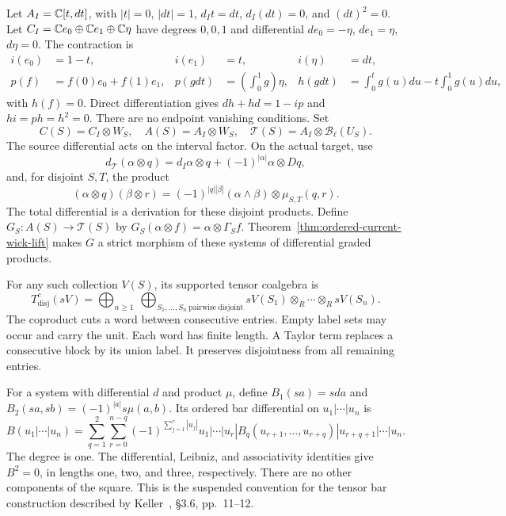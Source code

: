 Let $A_I=\mathbb C[t,dt]$, with $|t|=0$, $|dt|=1$, $d_It=dt$,
$d_I(dt)=0$, and $(dt)^2=0$.  Let
$C_I=\mathbb C e_0\oplus\mathbb C e_1\oplus\mathbb C\eta$ have degrees $0,0,1$ and
differential $de_0=-\eta$, $de_1=\eta$, $d\eta=0$.
The contraction is
\[
 \begin{aligned}
 i(e_0)&=1-t,&i(e_1)&=t,&i(\eta)&=dt,\\
 p(f)&=f(0)e_0+f(1)e_1,&
 p(gdt)&=\left(\int_0^1g\right)\eta,&
 h(gdt)&=\int_0^t g(u)du-t\int_0^1g(u)du,
 \end{aligned}
\]
with $h(f)=0$.  Direct differentiation gives
$dh+hd=1-ip$ and $hi=ph=h^2=0$.
There are no endpoint vanishing conditions.
Set
\[
 C(S)=C_I\otimes W_S,\quad A(S)=A_I\otimes W_S,\quad
 \mathcal T(S)=A_I\otimes\mathcal B_\ell(U_S).
\]
The source differential acts on the interval factor.
On the actual target, use
\[
 d_{\mathcal T}(\alpha\otimes q)
   =d_I\alpha\otimes q+(-1)^{|\alpha|}\alpha\otimes Dq,
\]
and, for disjoint $S,T$, the product
\[
 (\alpha\otimes q)(\beta\otimes r)
 =(-1)^{|q||\beta|}(\alpha\wedge\beta)\otimes\mu_{S,T}(q,r).
\]
The total differential is a derivation for these disjoint products.
Define $G_S:A(S)\to\mathcal T(S)$ by
$G_S(\alpha\otimes f)=\alpha\otimes\Gamma_Sf$.
Theorem~\ref{thm:ordered-current-wick-lift} makes $G$ a strict
morphism of these systems of differential graded products.

For any such collection $V(S)$, its supported tensor coalgebra is
\[
 T^c_{\mathrm{disj}}(sV)=
 \bigoplus_{n\ge1}\ \bigoplus_{S_1,\ldots,S_n\ \mathrm{pairwise\ disjoint}}
 sV(S_1)\otimes_R\cdots\otimes_R sV(S_n).
\]
The coproduct cuts a word between consecutive entries.  Empty label
sets may occur and carry the unit.  Each word has finite length.
A Taylor term replaces a consecutive block by its union label.
It preserves disjointness from all remaining entries.

For a system with differential $d$ and product $\mu$, define
$B_1(sa)=sda$ and $B_2(sa,sb)=(-1)^{|a|}s\mu(a,b)$.
Its ordered bar differential on $u_1|\cdots|u_n$ is
\begin{equation}
\label{eq:ordered-current-bar}
 B(u_1|\cdots|u_n)=
 \sum_{q=1}^{2}\sum_{r=0}^{n-q}
 (-1)^{\sum_{j=1}^{r}|u_j|}
 u_1|\cdots|u_r|B_q(u_{r+1},\ldots,u_{r+q})|
 u_{r+q+1}|\cdots|u_n.
\end{equation}
The degree is one.  The differential, Leibniz, and associativity
identities give $B^2=0$, in lengths one, two, and three, respectively.
There are no other components of the square.
This is the suspended convention for the tensor bar construction
described by Keller~\cite{KellerAInfinity}, \S3.6, pp.~11--12.

